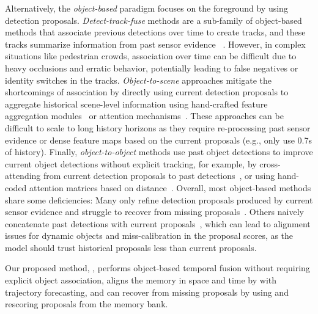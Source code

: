 Alternatively, the \textit{object-based} paradigm focuses on
the foreground by using detection proposals.
\textit{Detect-track-fuse} methods are a sub-family of object-based methods that associate previous detections over time to create tracks,
and these tracks summarize information from past sensor evidence
~\cite{liang2020pnpnet,huang2024ptt,chen2022mppnet,li2023modar,zhang2023motiontrack,li2023modar}.
However, in complex situations like pedestrian crowds, association over time can be difficult due to heavy occlusions and erratic behavior, potentially leading to false negatives or identity switches in the tracks.
\textit{Object-to-scene} approaches mitigate the shortcomings of association by directly using current detection proposals to aggregate historical scene-level information using hand-crafted feature aggregation modules~\cite{he2023msf} or attention mechanisms~\cite{zhou2022centerformer}.
These approaches can be difficult to scale to long history horizons as they require re-processing past sensor evidence or dense feature maps based on the current proposals
(e.g., \cite{zhou2022centerformer,he2023msf} only use 0.7s of history).
Finally, \textit{object-to-object} methods
use past object detections to improve current object detections without explicit tracking,
for example, by cross-attending from current detection proposals to past detections~\cite{yang20213d,wang2023exploring},
or using hand-coded attention matrices based on distance~\cite{hou2024query}.
Overall, most object-based methods share some deficiencies:
Many only refine detection proposals produced by current sensor evidence and struggle to recover from missing proposals~\cite{he2023msf,yang20213d,hou2024query,chen2022mppnet,huang2024ptt}.
Others naively concatenate past detections with current proposals~\cite{wang2023exploring}, which
can lead to alignment issues for dynamic objects and miss-calibration in the proposal scores, as the model should trust historical proposals less than current proposals.

Our proposed method, \ourmodel{}, performs object-based temporal fusion without requiring explicit object association, aligns the memory in space and time by with trajectory forecasting,
and can recover from missing proposals by using and rescoring proposals from the memory bank.
